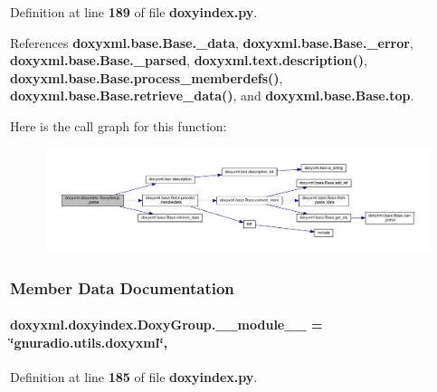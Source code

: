 Definition at line {\bf 189} of file {\bf doxyindex.\+py}.



References {\bf doxyxml.\+base.\+Base.\+\_\+data}, {\bf doxyxml.\+base.\+Base.\+\_\+error}, {\bf doxyxml.\+base.\+Base.\+\_\+parsed}, {\bf doxyxml.\+text.\+description()}, {\bf doxyxml.\+base.\+Base.\+process\+\_\+memberdefs()}, {\bf doxyxml.\+base.\+Base.\+retrieve\+\_\+data()}, and {\bf doxyxml.\+base.\+Base.\+top}.



Here is the call graph for this function\+:
\nopagebreak
\begin{figure}[H]
\begin{center}
\leavevmode
\includegraphics[width=350pt]{d6/da4/classdoxyxml_1_1doxyindex_1_1DoxyGroup_aac769ad975a5e2d5097e53098d1286a5_cgraph}
\end{center}
\end{figure}




\subsubsection{Member Data Documentation}
\paragraph[{\+\_\+\+\_\+module\+\_\+\+\_\+}]{ doxyxml.\+doxyindex.\+Doxy\+Group.\+\_\+\+\_\+module\+\_\+\+\_\+ = \char`\"{}gnuradio.\+utils.\+doxyxml\char`\"{}\hspace{0.3cm}{\ttfamily [static]}, {\ttfamily [private]}}\label{classdoxyxml_1_1doxyindex_1_1DoxyGroup_a6542bdc4d11862ca1abcff62844eca75}


Definition at line {\bf 185} of file {\bf doxyindex.\+py}.

